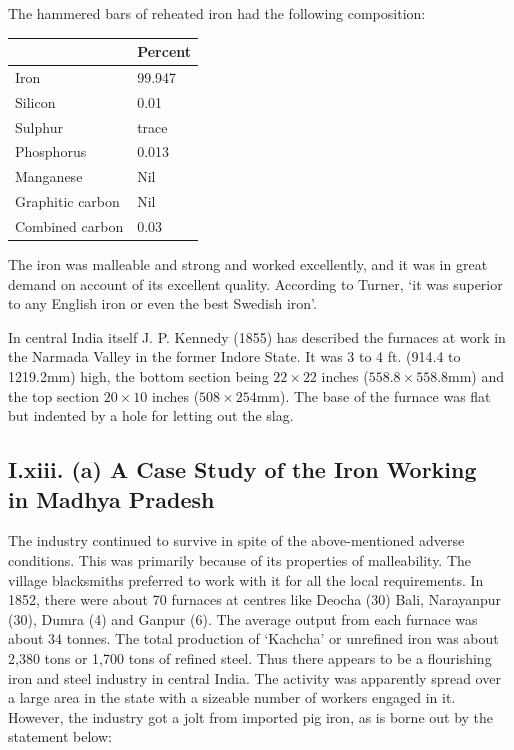 The hammered bars of reheated iron had the following composition:

{\fontsize{8}{10}\selectfont\begin{center}
\begin{tabular}{|l|l|}
\hline
 & Percent\\
\hline
Iron & 99.947\\
\hline
Silicon & 0.01\\
\hline
Sulphur & trace\\
\hline
Phosphorus & 0.013\\
\hline
Manganese & Nil\\
\hline
Graphitic carbon & Nil\\
\hline
Combined carbon & 0.03\\
\hline
\end{tabular}
\end{center}}

The iron was malleable and strong and worked excellently, and it was in great demand on account of its excellent quality. According to Turner, `it was superior to any English iron or even the best Swedish iron'. 

In central India itself J. P. Kennedy (1855) has described the furnaces at work in the Narmada Valley in the former Indore State. It was 3 to 4 ft. (914.4 to 1219.2mm) high, the bottom section being $22 \times 22$ inches ($558.8 \times 558.8$mm) and the top section $20 \times 10$ inches ($508 \times 254$mm). The base of the furnace was flat but indented by a hole for letting out the slag.

\vspace{-.3cm}

\subsection*{I.xiii. (a) A Case Study of the Iron Working\\ in Madhya Pradesh}\label{subsection-13}

\vspace{-.2cm}

The industry continued to survive in spite of the above-mentioned adverse conditions.  This was primarily because of its properties of malleability. The village blacksmiths preferred to work with it for all the local requirements. In 1852, there were about 70 furnaces at centres like Deocha (30) Bali, Narayanpur (30), Dumra (4) and Ganpur (6).  The average output from each furnace was about 34 tonnes.  The total production of `Kachcha' or unrefined iron was about 2,380 tons or 1,700 tons of refined steel. Thus there appears to be a flourishing iron and steel industry in central India. The activity was apparently spread over a large area in the state with a sizeable number of workers engaged in it. However, the industry got a jolt from imported pig iron, as is borne out by the statement below:  

